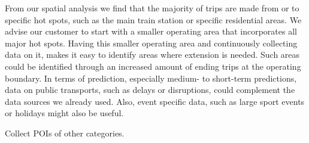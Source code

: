 From our spatial analysis we find that the majority of trips are made from or to specific hot spots, such as the main train station or specific residential areas.
We advise our customer to start with a smaller operating area that incorporates all major hot spots.
Having this smaller operating area and continuously collecting data on it, makes it easy to identify areas where extension is needed. Such areas could be identified through an increased amount of ending trips at the operating boundary.
In terms of prediction, especially medium- to short-term predictions, data on public transports, such as delays or disruptions, could complement the data sources we already used.
Also, event specific data, such as large sport events or holidays might also be useful.




Collect POIs of other categories.
